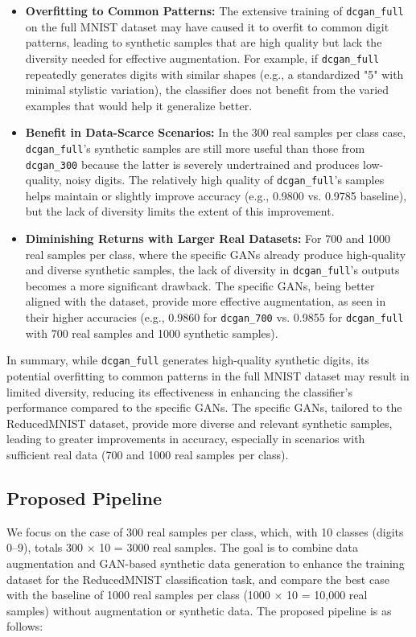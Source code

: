 \documentclass[12pt]{article}
\begin{document}
\begin{itemize}
    \item \textbf{Overfitting to Common Patterns:} The extensive training of \texttt{dcgan\_full} on the full MNIST dataset may have caused it to overfit to common digit patterns, leading to synthetic samples that are high quality but lack the diversity needed for effective augmentation. For example, if \texttt{dcgan\_full} repeatedly generates digits with similar shapes (e.g., a standardized "5" with minimal stylistic variation), the classifier does not benefit from the varied examples that would help it generalize better.
    
    \item \textbf{Benefit in Data-Scarce Scenarios:} In the 300 real samples per class case, \texttt{dcgan\_full}’s synthetic samples are still more useful than those from \texttt{dcgan\_300} because the latter is severely undertrained and produces low-quality, noisy digits. The relatively high quality of \texttt{dcgan\_full}’s samples helps maintain or slightly improve accuracy (e.g., 0.9800 vs. 0.9785 baseline), but the lack of diversity limits the extent of this improvement.
    
    \item \textbf{Diminishing Returns with Larger Real Datasets:} For 700 and 1000 real samples per class, where the specific GANs already produce high-quality and diverse synthetic samples, the lack of diversity in \texttt{dcgan\_full}’s outputs becomes a more significant drawback. The specific GANs, being better aligned with the dataset, provide more effective augmentation, as seen in their higher accuracies (e.g., 0.9860 for \texttt{dcgan\_700} vs. 0.9855 for \texttt{dcgan\_full} with 700 real samples and 1000 synthetic samples).
\end{itemize}

In summary, while \texttt{dcgan\_full} generates high-quality synthetic digits, its potential overfitting to common patterns in the full MNIST dataset may result in limited diversity, reducing its effectiveness in enhancing the classifier’s performance compared to the specific GANs. The specific GANs, tailored to the ReducedMNIST dataset, provide more diverse and relevant synthetic samples, leading to greater improvements in accuracy, especially in scenarios with sufficient real data (700 and 1000 real samples per class).
\subsection{Proposed Pipeline}
\label{subsec:pipeline}
We focus on the case of 300 real samples per class, which, with 10 classes (digits 0–9), totals 300 $\times$ 10 = 3000 real samples. The goal is to combine data augmentation and GAN-based synthetic data generation to enhance the training dataset for the ReducedMNIST classification task, and compare the best case with the baseline of 1000 real samples per class (1000 $\times$ 10 = 10,000 real samples) without augmentation or synthetic data. The proposed pipeline is as follows:
\end{document}
